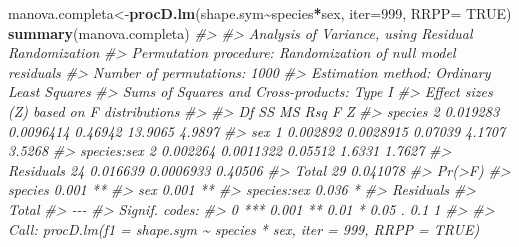\documentclass[
]{book}
\newenvironment{Shaded}{\begin{snugshade}}{\end{snugshade}}
\newcommand{\AttributeTok}[1]{\textcolor[rgb]{0.13,0.29,0.53}{#1}}
\newcommand{\CommentTok}[1]{\textcolor[rgb]{0.56,0.35,0.01}{\textit{#1}}}
\newcommand{\ConstantTok}[1]{\textcolor[rgb]{0.56,0.35,0.01}{#1}}
\newcommand{\DecValTok}[1]{\textcolor[rgb]{0.00,0.00,0.81}{#1}}
\newcommand{\FunctionTok}[1]{\textcolor[rgb]{0.13,0.29,0.53}{\textbf{#1}}}
\newcommand{\NormalTok}[1]{#1}
\newcommand{\OtherTok}[1]{\textcolor[rgb]{0.56,0.35,0.01}{#1}}
\newcommand{\SpecialCharTok}[1]{\textcolor[rgb]{0.81,0.36,0.00}{\textbf{#1}}}
\begin{document}
\begin{Shaded}
\begin{Highlighting}[]
\NormalTok{manova.completa}\OtherTok{\textless{}{-}}\FunctionTok{procD.lm}\NormalTok{(shape.sym}\SpecialCharTok{\textasciitilde{}}\NormalTok{species}\SpecialCharTok{*}\NormalTok{sex, }\AttributeTok{iter=}\DecValTok{999}\NormalTok{, }\AttributeTok{RRPP=} \ConstantTok{TRUE}\NormalTok{)}
\FunctionTok{summary}\NormalTok{(manova.completa)}
\CommentTok{\#\textgreater{} }
\CommentTok{\#\textgreater{} Analysis of Variance, using Residual Randomization}
\CommentTok{\#\textgreater{} Permutation procedure: Randomization of null model residuals }
\CommentTok{\#\textgreater{} Number of permutations: 1000 }
\CommentTok{\#\textgreater{} Estimation method: Ordinary Least Squares }
\CommentTok{\#\textgreater{} Sums of Squares and Cross{-}products: Type I }
\CommentTok{\#\textgreater{} Effect sizes (Z) based on F distributions}
\CommentTok{\#\textgreater{} }
\CommentTok{\#\textgreater{}             Df       SS        MS     Rsq       F      Z}
\CommentTok{\#\textgreater{} species      2 0.019283 0.0096414 0.46942 13.9065 4.9897}
\CommentTok{\#\textgreater{} sex          1 0.002892 0.0028915 0.07039  4.1707 3.5268}
\CommentTok{\#\textgreater{} species:sex  2 0.002264 0.0011322 0.05512  1.6331 1.7627}
\CommentTok{\#\textgreater{} Residuals   24 0.016639 0.0006933 0.40506               }
\CommentTok{\#\textgreater{} Total       29 0.041078                                 }
\CommentTok{\#\textgreater{}             Pr(\textgreater{}F)   }
\CommentTok{\#\textgreater{} species      0.001 **}
\CommentTok{\#\textgreater{} sex          0.001 **}
\CommentTok{\#\textgreater{} species:sex  0.036 * }
\CommentTok{\#\textgreater{} Residuals            }
\CommentTok{\#\textgreater{} Total                }
\CommentTok{\#\textgreater{} {-}{-}{-}}
\CommentTok{\#\textgreater{} Signif. codes:  }
\CommentTok{\#\textgreater{} 0 \textquotesingle{}***\textquotesingle{} 0.001 \textquotesingle{}**\textquotesingle{} 0.01 \textquotesingle{}*\textquotesingle{} 0.05 \textquotesingle{}.\textquotesingle{} 0.1 \textquotesingle{} \textquotesingle{} 1}
\CommentTok{\#\textgreater{} }
\CommentTok{\#\textgreater{} Call: procD.lm(f1 = shape.sym \textasciitilde{} species * sex, iter = 999, RRPP = TRUE)}


\end{Highlighting}
\end{Shaded}
\end{document}
